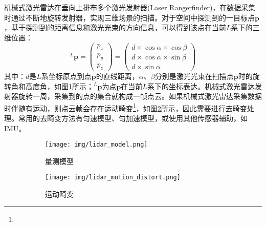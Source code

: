 机械式激光雷达在垂向上排布多个激光发射器(Laser Rangerfinder)，在数据采集时通过不断地旋转发射器，实现三维场景的扫描。对于空间中探测到的一目标点$\boldsymbol{p}$，基于探测到的距离信息和激光光束的方向信息，可以得到该点在当前$L$系下的三维位置：
\begin{equation}
  \label{equ:lidar_model}
  {^{L}\boldsymbol{p}}=\begin{pmatrix}
    p_x \\
    p_y \\
    p_z
  \end{pmatrix}=\begin{pmatrix}
    d\times\cos\alpha\times\cos\beta \\
    d\times\cos\alpha\times\sin\beta \\
    d\times\sin\alpha
  \end{pmatrix}
\end{equation}
其中：$d$是$L$系坐标原点到点$\boldsymbol{p}$的直线距离，$\alpha$、$\beta$分别是激光光束在扫描点$\boldsymbol{p}$时的旋转角和高度角，如图\ref{fig:lidar_model}所示；${^{L}\boldsymbol{p}}$为点$\boldsymbol{p}$在当前$L$系下的坐标表达。机械式激光雷达发射器旋转一周，采集到的点的集合就构成一帧点云。如果机械式激光雷达采集数据时伴随有运动，则点云帧会存在运动畸变\footnote{}，如图\ref{fig:lidar_motion_distort}所示，因此需要进行去畸变处理。常用的去畸变方法有匀速模型、匀加速模型，或使用其他传感器辅助，如IMU。
  \begin{figure}[htbp]
    \centering

    \begin{subfigure}{0.48\textwidth}
    \texttt{[image: img/lidar\_model.png]}
    \caption{量测模型}
    \label{fig:lidar_model}
    \end{subfigure}
    \begin{subfigure}{0.48\textwidth}
      \texttt{[image: img/lidar\_motion\_distort.png]}
      \caption{运动畸变}
      \label{fig:lidar_motion_distort}
      \end{subfigure}

    \caption{}

    \label{fig:lidar}
  \end{figure}

